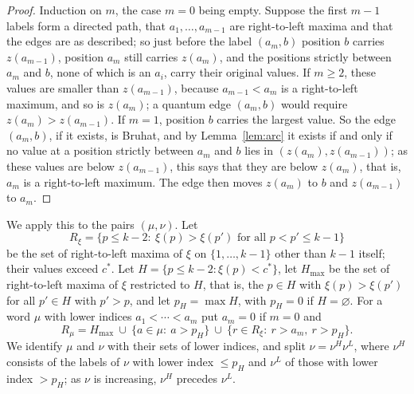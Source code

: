 \documentclass[11pt]{article}
\begin{document}
\begin{proof}
Induction on $m$, the case $m=0$ being empty. Suppose the first $m-1$
labels form a directed path, that $a_1,\ldots,a_{m-1}$ are
right-to-left maxima and that the edges are as described; so just
before the label $(a_m,b)$ position $b$ carries $z(a_{m-1})$, position
$a_m$ still carries $z(a_m)$, and the positions strictly between $a_m$
and $b$, none of which is an $a_i$, carry their original values. If
$m\geq2$, these values are smaller than $z(a_{m-1})$, because
$a_{m-1}<a_m$ is a right-to-left maximum, and so is $z(a_m)$; a quantum
edge $(a_m,b)$ would require $z(a_m)>z(a_{m-1})$. If $m=1$, position
$b$ carries the largest value. So the edge $(a_m,b)$, if it exists, is
Bruhat, and by Lemma~\ref{lem:arc} it exists if and only if no value
at a position strictly between $a_m$ and $b$ lies in
$(z(a_m),z(a_{m-1}))$; as these values are below $z(a_{m-1})$, this
says that they are below $z(a_m)$, that is, $a_m$ is a right-to-left
maximum. The edge then moves $z(a_m)$ to $b$ and $z(a_{m-1})$ to $a_m$.
\end{proof}

We apply this to the pairs $(\mu,\nu)$. Let
\[
 R_\xi=\{p\leq k-2:\ \xi(p)>\xi(p')\text{ for all }p<p'\leq k-1\}
\]
be the set of right-to-left maxima of $\xi$ on $\{1,\ldots,k-1\}$
other than $k-1$ itself; their values exceed $c^\ast$. Let
$H=\{p\leq k-2:\xi(p)<c^\ast\}$, let $H_{\max}$ be the set of
right-to-left maxima of $\xi$ restricted to $H$, that is, the $p\in H$
with $\xi(p)>\xi(p')$ for all $p'\in H$ with $p'>p$, and let
$p_H=\max H$, with $p_H=0$ if $H=\varnothing$. For a word $\mu$ with
lower indices $a_1<\cdots<a_m$ put $a_m=0$ if $m=0$ and
\[
 R_\mu=H_{\max}\ \cup\ \{a\in\mu:\ a>p_H\}\ \cup\ \{r\in R_\xi:\ r>a_m,\ r>p_H\}.
\]
We identify $\mu$ and $\nu$ with their sets of lower indices, and
split $\nu=\nu^H\nu^L$, where $\nu^H$ consists of the labels of $\nu$
with lower index $\leq p_H$ and $\nu^L$ of those with lower index
$>p_H$; as $\nu$ is increasing, $\nu^H$ precedes $\nu^L$.
\end{document}
